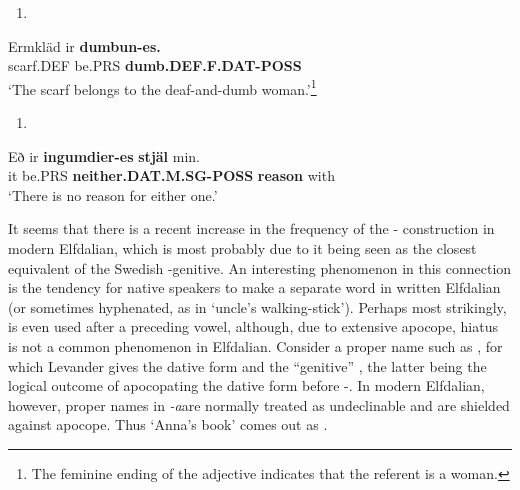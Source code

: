 \begin{enumerate} %
\item 
\end{enumerate} %
\ea\label{}
\gll Ermkläd  ir  \textbf{dumbun-es.}\\


scarf.DEF  be.PRS  \textbf{dumb.DEF.F.DAT-POSS}\\ %


‘The scarf belongs to the deaf-and-dumb woman.’\footnote{ The feminine ending of the adjective indicates that the referent is a woman.}
\z

\begin{enumerate} %
\item 
\end{enumerate} %
\ea\label{}
\gll Eð  ir  \textbf{ingumdier-es}\textbf{  stjäl} min.  \\


it  be.PRS  \textbf{neither.DAT.M.SG-POSS} \textbf{reason} with  \\ %


‘There is no reason for either one.’
\z


It seems that there is a recent increase in the frequency of the \nobreakdash- construction in modern Elfdalian, which is most probably due to it being seen as the closest equivalent of the Swedish -genitive. An interesting phenomenon in this connection is the tendency for native speakers to make  a separate word in written Elfdalian (or sometimes hyphenated, as in  ‘uncle’s walking-stick’). Perhaps most strikingly,  is even used after a preceding vowel, although, due to extensive apocope, hiatus is not a common phenomenon in Elfdalian. Consider a proper name such as , for which Levander gives the dative form  and the “genitive” , the latter being the logical outcome of apocopating the dative form before {}-. In modern Elfdalian, however, proper names in\textit{ {}-a}\textstyleLinguisticExample{ }are normally treated as undeclinable and are shielded against apocope. Thus ‘Anna’s book’ comes out as . 

